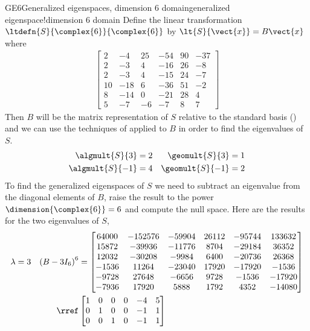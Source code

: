 \begin{example}{GE6}{Generalized eigenspaces, dimension 6 domain}{generalized eigenspace!dimension 6 domain}
Define the linear transformation $\ltdefn{S}{\complex{6}}{\complex{6}}$  by $\lt{S}{\vect{x}}=B\vect{x}$ where
%
\begin{align*}
\begin{bmatrix}
 2 & -4 & 25 & -54 & 90 & -37 \\
 2 & -3 & 4 & -16 & 26 & -8 \\
 2 & -3 & 4 & -15 & 24 & -7 \\
 10 & -18 & 6 & -36 & 51 & -2 \\
 8 & -14 & 0 & -21 & 28 & 4 \\
 5 & -7 & -6 & -7 & 8 & 7
\end{bmatrix}
\end{align*}
%
Then $B$ will be the matrix representation of $S$ relative to the standard basis () and we can use the techniques of  applied to $B$ in order to find the eigenvalues of $S$.
%
\begin{align*}
\algmult{S}{3}&=2  &  \geomult{S}{3}&=1\\
\algmult{S}{-1}&=4  &  \geomult{S}{-1}&=2\\
\end{align*}
%
To find the generalized eigenspaces of $S$ we need to subtract an eigenvalue from the diagonal elements of $B$, raise the result to the power $\dimension{\complex{6}}=6$ and compute the null space.  Here are the results for the two eigenvalues of $S$,
%
\begin{align*}
\lambda&=3
&
\left(B-3I_6\right)^6
&=
\begin{bmatrix}
64000 & -152576 & -59904 & 26112 & -95744 & 133632 \\
15872 & -39936 & -11776 & 8704 & -29184 & 36352 \\
12032 & -30208 & -9984 & 6400 & -20736 & 26368 \\
-1536 & 11264 & -23040 & 17920 & -17920 & -1536 \\
-9728 & 27648 & -6656 & 9728 & -1536 & -17920 \\
-7936 & 17920 & 5888 & 1792 & 4352 & -14080
\end{bmatrix}\\
%
&&
\rref&
\begin{bmatrix}
 1 & 0 & 0 & 0 & -4 & 5 \\
 0 & 1 & 0 & 0 & -1 & 1 \\
 0 & 0 & 1 & 0 & -1 & 1 \\

\end{bmatrix}
\end{align*}
\end{example}
